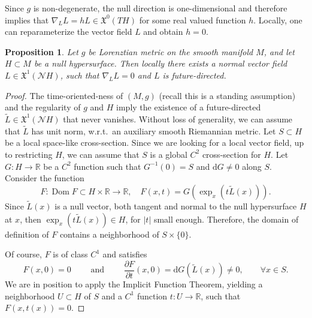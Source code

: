 \documentclass[12pt,a4paper]{amsart}
\theoremstyle{plain}
\newtheorem{proposition}[lemma]{Proposition}
\theoremstyle{definition}
\numberwithin{equation}{section}
\newcommand{\R}{\mathbb{R}}
\DeclareMathOperator{\Dom}{Dom}
\newcommand{\de}{{\mathrm{d}}}
\newcommand{\vfield}{\mathfrak{X}}
\newcommand{\normal}{\mathscr{N}}
\begin{document}
Since $g$ is non-degenerate, the null
direction is one-dimensional and therefore  implies 
that $\nabla_L L = h L \in \vfield^0(TH)$ for some real valued function $h$.
Locally, one can reparameterize the vector field $L$ and obtain $h = 0$. 







\begin{proposition}
\label{P:local-null-geodesics-smart}
Let $g$ be Lorenztian metric on the smooth manifold $M$, and let
$H\subset M$ be a null hypersurface.
%
Then locally there exists a normal vector field $L\in\vfield^{1}(\normal H)$, such that 
$\nabla_LL=0$ and $L$ is future-directed.
\end{proposition}

\begin{proof}
The time-oriented-ness of $(M,g)$ (recall this is a standing assumption) and the regularity of $g$ and $H$ imply the existence of a future-directed $\tilde L \in \vfield^1(\normal H)$ that never vanishes.
  Without loss of generality, we can assume that $\tilde L$ has unit norm, w.r.t.\ an auxiliary smooth
  Riemannian metric.
  Let $S\subset H$ be a local space-like cross-section.
  Since we are looking for a local vector field, up to restricting
  $H$, we can assume that $S$ is a  global $C^2$ cross-section for $H$.
  Let $G:H\to \R$ be a $C^{2}$ function such that 
  $G^{-1}(0)=S$ and $\de G\neq 0$
  along $S$.
  Consider the function 
  $$F:\Dom F\subset H\times \R\to\R, \quad F(x,t)=G(\exp_{x}(t\tilde L(x))).$$ 
   Since $\tilde{L}(x)$ is a null vector, both tangent and normal to the null hypersurface $H$ at $x$, then $\exp_x(t\tilde L(x))\in H$, for $|t|$ small enough. Therefore,
  the domain of definition of $F$
  contains a neighborhood of $S\times\{0\}$. 
  
  Of course, $F$ is of class $C^1$ and satisfies
  \begin{equation}
    F(x,0)=0
    \qquad
    \text{ and }
    \qquad
    \frac{\partial F}{\partial t}(x,0)=\de G (\tilde L(x))\neq 0
    ,
    \qquad
    \forall x\in S
    .
  \end{equation}
  We are in position to apply the Implicit Function Theorem,  yielding a
  neighborhood $U\subset H$ of $S$ and a $C^1$ function $t:U\to
  \R$, such that $F(x,t(x))=0$.


\end{proof}
\end{document}
